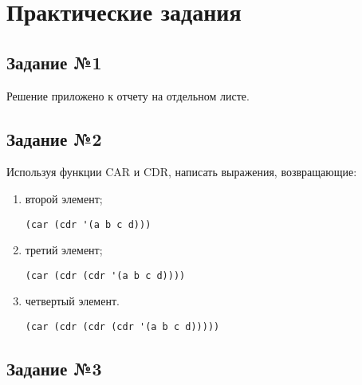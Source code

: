 \chapter{Практические задания}

\section{Задание №1}

Решение приложено к отчету на отдельном листе.

\section{Задание №2}

Используя функции $\text{CAR}$ и $\text{CDR}$, написать выражения,
возвращающие:
\begin{enumerate}
    \item второй элемент;

    \vspace{4mm}
    \hfill
    \begin{minipage}{0.81\linewidth}
    \begin{lstlisting}
(car (cdr '(a b c d)))
    \end{lstlisting}
    \end{minipage}

    \item третий элемент;

    \vspace{4mm}
    \hfill
    \begin{minipage}{0.81\linewidth}
    \begin{lstlisting}
(car (cdr (cdr '(a b c d))))
    \end{lstlisting}
    \end{minipage}

    \item четвертый элемент.

    \vspace{4mm}
    \hfill
    \begin{minipage}{0.81\linewidth}
    \begin{lstlisting}
(car (cdr (cdr (cdr '(a b c d)))))
    \end{lstlisting}
    \end{minipage}
\end{enumerate}

\section{Задание №3}

